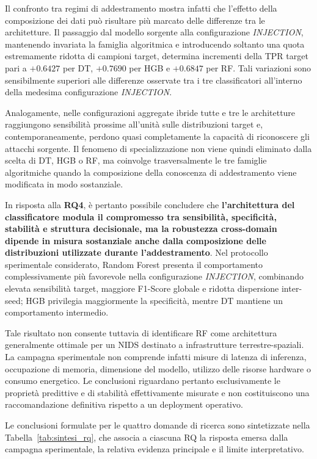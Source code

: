 Il confronto tra regimi di addestramento mostra infatti che l'effetto della composizione dei dati può risultare più marcato delle differenze tra le architetture.
Il passaggio dal modello sorgente alla configurazione \textit{INJECTION}, mantenendo invariata la famiglia algoritmica e introducendo soltanto una quota estremamente ridotta di campioni target, determina incrementi della TPR target pari a $+0.6427$ per DT, $+0.7690$ per HGB e $+0.6847$ per RF.
Tali variazioni sono sensibilmente superiori alle differenze osservate tra i tre classificatori all'interno della medesima configurazione \textit{INJECTION}.

Analogamente, nelle configurazioni aggregate ibride tutte e tre le architetture raggiungono sensibilità prossime all'unità sulle distribuzioni target e, contemporaneamente, perdono quasi completamente la capacità di riconoscere gli attacchi sorgente.
Il fenomeno di specializzazione non viene quindi eliminato dalla scelta di DT, HGB o RF, ma coinvolge trasversalmente le tre famiglie algoritmiche quando la composizione della conoscenza di addestramento viene modificata in modo sostanziale.

In risposta alla \textbf{RQ4}, è pertanto possibile concludere che \textbf{l'architettura del classificatore modula il compromesso tra sensibilità, specificità, stabilità e struttura decisionale, ma la robustezza cross-domain dipende in misura sostanziale anche dalla composizione delle distribuzioni utilizzate durante l'addestramento}.
Nel protocollo sperimentale considerato, Random Forest presenta il comportamento complessivamente più favorevole nella configurazione \textit{INJECTION}, combinando elevata sensibilità target, maggiore F1-Score globale e ridotta dispersione inter-seed; HGB privilegia maggiormente la specificità, mentre DT mantiene un comportamento intermedio.

Tale risultato non consente tuttavia di identificare RF come architettura generalmente ottimale per un NIDS destinato a infrastrutture terrestre-spaziali.
La campagna sperimentale non comprende infatti misure di latenza di inferenza, occupazione di memoria, dimensione del modello, utilizzo delle risorse hardware o consumo energetico.
Le conclusioni riguardano pertanto esclusivamente le proprietà predittive e di stabilità effettivamente misurate e non costituiscono una raccomandazione definitiva rispetto a un deployment operativo.

Le conclusioni formulate per le quattro domande di ricerca sono sintetizzate nella Tabella~\ref{tab:sintesi_rq}, che associa a ciascuna RQ la risposta emersa dalla campagna sperimentale, la relativa evidenza principale e il limite interpretativo.

